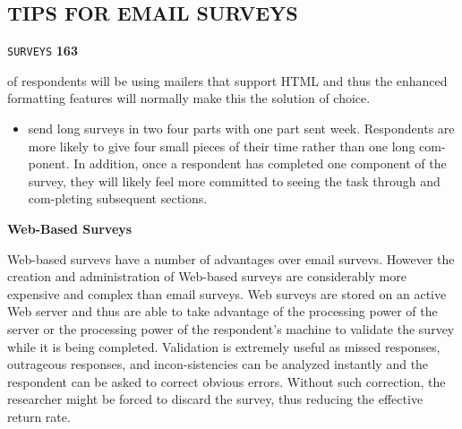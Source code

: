 \documentclass[8pt]{beamer}
\begin{document}
\begin{frame}
\section*{TIPS FOR EMAIL SURVEYS}
\begin{flushright}
 \texttt{SURVEYS} \hspace*{1cm} \textbf{163}
\end{flushright}

\vspace*{0.5cm}
of respondents will be using mailers that support HTML and thus the enhanced formatting features will normally make this the solution of choice.\\
\begin{itemize}
  \item send long surveys in two four parts with one part sent week. Respondents are more likely to give four small pieces of their time rather than one long com-ponent. In addition, once a respondent has completed one component of the survey, they will likely feel more committed to seeing the task through and com-pleting subsequent sections.\\
\end{itemize}

\vspace*{0.4cm}
\end{frame}

\begin{frame}
\large{
\textbf{Web-Based Surveys}
}

\vspace*{0.2cm}
Web-based survevs have a number of advantages over email survevs. However the creation and administration of Web-based surveys are considerably more expensive and complex than email surveys. Web surveys are stored on an active Web server and thus are able to take advantage of the processing power of the server or the processing power of the respondent's machine to validate the survey while it is being completed. Validation is extremely useful as missed responses, outrageous responses, and incon-sistencies can be analyzed instantly and the respondent can be asked to correct obvious errors. Without such correction, the researcher might be forced to discard the survey, thus reducing the effective return rate.\\

\end{frame}
\end{document}
